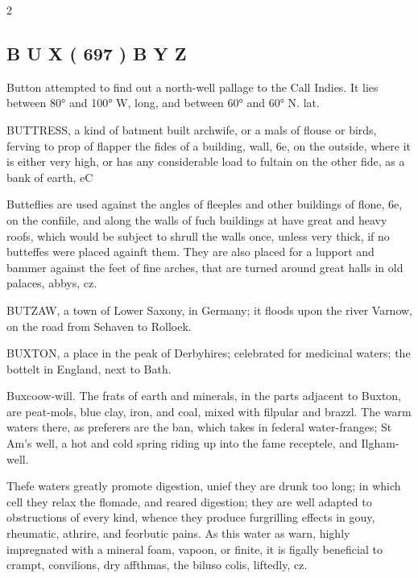 \documentclass[10pt]{article}
\begin{document}
\begin{multicols}{2}\raggedcolumns
\subsection*{B U X ( 697 ) B Y Z}
Button attempted to find out a north-well pallage to the Call Indies. It lies between 80° and 100° W, long, and between 60° and 60° N. lat.

BUTTRESS, a kind of batment built archwife, or a mals of flouse or birds, ferving to prop of flapper the fides of a building, wall, 6e, on the outside, where it is either very high, or has any considerable load to fultain on the other fide, as a bank of earth, eC

Butteflies are used against the angles of fleeples and other buildings of flone, 6e, on the confiile, and along the walls of fuch buildings at have great and heavy roofs, which would be subject to shrull the walls once, unless very thick, if no butteffes were placed againft them. They are also placed for a lupport and bammer against the feet of fine arches, that are turned around great halls in old palaces, abbys, cz.

BUTZAW, a town of Lower Saxony, in Germany; it floods upon the river Varnow, on the road from Sehaven to Rolloek.

BUXTON, a place in the peak of Derbyhires; celebrated for medicinal waters; the bottelt in England, next to Bath.

Buxcoow-will. The frats of earth and minerals, in the parts adjacent to Buxton, are peat-mols, blue clay, iron, and coal, mixed with filpular and brazzl. The warm waters there, as preferers are the ban, which takes in federal water-franges; St Am’s well, a hot and cold spring riding up into the fame receptele, and Ilgham-well.

Thefe waters greatly promote digestion, unief they are drunk too long; in which cell they relax the flomade, and reared digestion; they are well adapted to obstructions of every kind, whence they produce furgrilling effects in gouy, rheumatic, athrire, and feorbutic pains. As this water as warn, highly impregnated with a mineral foam, vapoon, or finite, it is figally beneficial to crampt, convilions, dry affthmas, the biluso colis, liftedly, cz.


\end{multicols}
\end{document}
